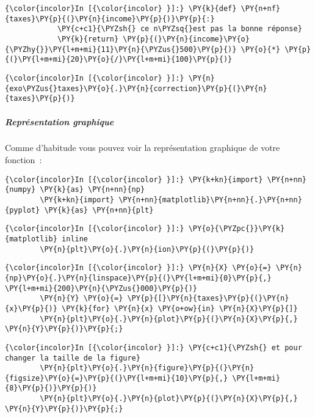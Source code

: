     \begin{Verbatim}[commandchars=\\\{\}]
{\color{incolor}In [{\color{incolor} }]:} \PY{k}{def} \PY{n+nf}{taxes}\PY{p}{(}\PY{n}{income}\PY{p}{)}\PY{p}{:}
            \PY{c+c1}{\PYZsh{} ce n\PYZsq{}est pas la bonne réponse}
            \PY{k}{return} \PY{p}{(}\PY{n}{income}\PY{o}{\PYZhy{}}\PY{l+m+mi}{11}\PY{n}{\PYZus{}500}\PY{p}{)} \PY{o}{*} \PY{p}{(}\PY{l+m+mi}{20}\PY{o}{/}\PY{l+m+mi}{100}\PY{p}{)}
\end{Verbatim}


    \begin{Verbatim}[commandchars=\\\{\}]
{\color{incolor}In [{\color{incolor} }]:} \PY{n}{exo\PYZus{}taxes}\PY{o}{.}\PY{n}{correction}\PY{p}{(}\PY{n}{taxes}\PY{p}{)}
\end{Verbatim}


    \hypertarget{repruxe9sentation-graphique}{%
\subparagraph{Représentation
graphique}\label{repruxe9sentation-graphique}}

    Comme d'habitude vous pouvez voir la représentation graphique de votre
fonction~:

    \begin{Verbatim}[commandchars=\\\{\}]
{\color{incolor}In [{\color{incolor} }]:} \PY{k+kn}{import} \PY{n+nn}{numpy} \PY{k}{as} \PY{n+nn}{np}
        \PY{k+kn}{import} \PY{n+nn}{matplotlib}\PY{n+nn}{.}\PY{n+nn}{pyplot} \PY{k}{as} \PY{n+nn}{plt}
\end{Verbatim}


    \begin{Verbatim}[commandchars=\\\{\}]
{\color{incolor}In [{\color{incolor} }]:} \PY{o}{\PYZpc{}}\PY{k}{matplotlib} inline
        \PY{n}{plt}\PY{o}{.}\PY{n}{ion}\PY{p}{(}\PY{p}{)}
\end{Verbatim}


    \begin{Verbatim}[commandchars=\\\{\}]
{\color{incolor}In [{\color{incolor} }]:} \PY{n}{X} \PY{o}{=} \PY{n}{np}\PY{o}{.}\PY{n}{linspace}\PY{p}{(}\PY{l+m+mi}{0}\PY{p}{,} \PY{l+m+mi}{200}\PY{n}{\PYZus{}000}\PY{p}{)}
        \PY{n}{Y} \PY{o}{=} \PY{p}{[}\PY{n}{taxes}\PY{p}{(}\PY{n}{x}\PY{p}{)} \PY{k}{for} \PY{n}{x} \PY{o+ow}{in} \PY{n}{X}\PY{p}{]}
        \PY{n}{plt}\PY{o}{.}\PY{n}{plot}\PY{p}{(}\PY{n}{X}\PY{p}{,} \PY{n}{Y}\PY{p}{)}\PY{p}{;}
\end{Verbatim}


    \begin{Verbatim}[commandchars=\\\{\}]
{\color{incolor}In [{\color{incolor} }]:} \PY{c+c1}{\PYZsh{} et pour changer la taille de la figure}
        \PY{n}{plt}\PY{o}{.}\PY{n}{figure}\PY{p}{(}\PY{n}{figsize}\PY{o}{=}\PY{p}{(}\PY{l+m+mi}{10}\PY{p}{,} \PY{l+m+mi}{8}\PY{p}{)}\PY{p}{)}
        \PY{n}{plt}\PY{o}{.}\PY{n}{plot}\PY{p}{(}\PY{n}{X}\PY{p}{,} \PY{n}{Y}\PY{p}{)}\PY{p}{;}
\end{Verbatim}